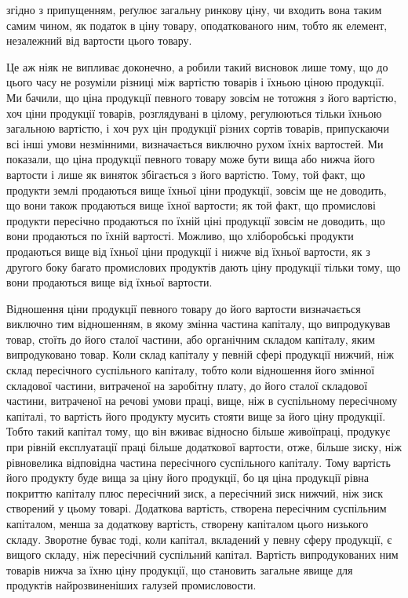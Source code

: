 \parcont{}  %
згідно з припущенням, реґулює загальну ринкову ціну, чи входить вона таким самим чином, як податок в
ціну товару, оподаткованого ним, тобто як елемент, незалежний від вартости цього товару.

Це аж ніяк не випливає доконечно, а робили такий висновок лише тому,
що до цього часу не розуміли різниці між вартістю товарів і їхньою ціною
продукції. Ми бачили, що ціна продукції певного товару зовсім не тотожня
з його вартістю, хоч ціни продукції товарів, розглядувані в цілому, регулюються
тільки їхньою загальною вартістю, і хоч рух цін продукції різних сортів
товарів, припускаючи всі інші умови незмінними, визначається виключно
рухом їхніх вартостей. Ми показали, що ціна продукції певного товару може
бути вища або нижча його вартости і лише як виняток збігається з його вартістю.
Тому, той факт, що продукти землі продаються вище їхньої ціни продукції,
зовсім ще не доводить, що вони також продаються вище їхної вартости; як той факт, що промислові
продукти пересічно продаються по їхній ціні продукції зовсім не доводить, що вони продаються по
їхній вартості. Можливо, що хліборобські продукти продаються вище від їхньої ціни продукції і нижче
від їхньої вартости, як з другого боку багато промислових продуктів дають ціну продукції тільки
тому, що вони продаються вище від їхньої вартости.

Відношення ціни продукції певного товару до його вартости визначається
виключно тим відношенням, в якому змінна частина капіталу, що випродукував товар, стоїть до його
сталої частини, або органічним складом капіталу, яким випродуковано товар. Коли склад капіталу у
певній сфері продукції нижчий, ніж склад пересічного суспільного капіталу, тобто коли відношення
його змінної складової частини, витраченої на заробітну плату, до його сталої складової частини,
витраченої на речові умови праці, вище, ніж в суспільному пересічному капіталі, то вартість його
продукту мусить стояти вище за його ціну продукції. Тобто такий капітал тому, що він вживає відносно
більше живоїпраці, продукує при рівній експлуатації праці більше додаткової вартости, отже, більше
зиску, ніж рівновелика відповідна частина пересічного суспільного капіталу. Тому вартість його
продукту буде вища за ціну його продукції, бо ця ціна продукції рівна покриттю капіталу плюс
пересічний зиск, а пересічний зиск нижчий, ніж зиск створений у цьому товарі. Додаткова вартість,
створена пересічним суспільним капіталом, менша за додаткову вартість, створену капіталом цього
низького складу. Зворотне буває тоді, коли капітал, вкладений у певну сферу продукції, є вищого
складу, ніж пересічний суспільний капітал. Вартість випродукованих ним товарів нижча за їхню ціну
продукції, що становить загальне явище для продуктів найрозвиненіших галузей промисловости.

